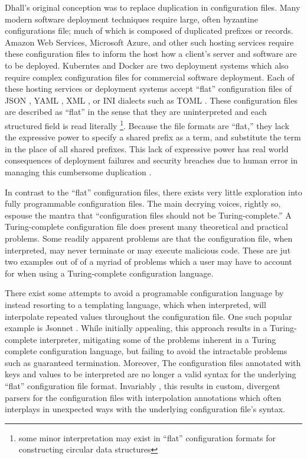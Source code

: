 \documentclass[12pt]{diazessay}
\begin{document}
Dhall's original conception was to replace duplication in configuration files.
Many modern software deployment techniques require large, often byzantine configurations file; much of which is composed of duplicated prefixes or records.
Amazon Web Services, Microsoft Azure, and other such hosting services require these configuration files to inform the host how a client's server and software are to be deployed.
Kuberntes \cite{Kubernetes2015} and Docker \cite{Barbier2014} are two deployment systems which also require complex configuration files for commercial software deployment.
Each of these hosting services or deployment systems accept ``flat'' configuration files of JSON \cite{ecma2017standard}, YAML \cite{ben2009yaml}, XML \cite{bray2000extensible}, or INI dialects such as TOML \cite{TOML}.
These configuration files are described as ``flat'' in the sense that they are uninterpreted and each structured field is read literally \footnote{some minor interpretation may exist in ``flat'' configuration formats for constructing circular data structures}.
Because the file formats are ``flat,'' they lack the expressive power to specify a shared prefix as a term, and substitute the term in the place of all shared prefixes.
This lack of expressive power has real world consequences of deployment failures and security breaches due to human error in managing this cumbersome duplication \cite{Fugue2020}.

In contrast to the ``flat'' configuration files, there exists very little exploration into fully programmable configuration files.
The main decrying voices, rightly so, espouse the mantra that ``configuration files should not be Turing-complete.'' A Turing-complete \cite{turing1937computable} configuration file does present many theoretical and practical problems.
Some readily apparent problems are that the configuration file, when interpreted, may never terminate or may execute malicious code.
These are jut two examples out of of a myriad of problems which a user may have to account for when using a Turing-complete configuration language.

There exist some attempts to avoid a programable configuration language by instead resorting to a templating language, which when interpreted, will interpolate repeated values throughout the configuration file.
One such popular example is Jsonnet \cite{JSONnet}.
While initially appealing, this approach results in a Turing-complete interpreter, mitigating some of the problems inherent in a Turing complete configuration language, but failing to avoid the intractable problems such as guaranteed termination.
Moreover, The configuration files annotated with keys and values to be interpreted are no longer a valid syntax for the underlying ``flat'' configuration file format.
Invariably , this results in custom, divergent parsers for the configuration files with interpolation annotations which often interplays in unexpected ways with the underlying configuration file's syntax.
\end{document}
